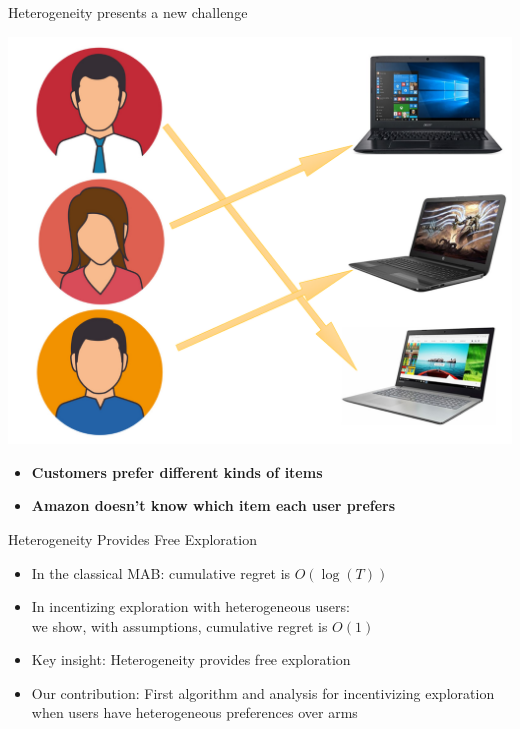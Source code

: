 \documentclass[serif]{beamer}
\begin{document}

\begin{frame}{Heterogeneity presents a new challenge}
\begin{center}
\includegraphics[scale=0.35]{example2}
\end{center}
\begin{itemize}
\item \textbf{Customers prefer different kinds of items}
\item \textbf{Amazon doesn't know which item each user prefers}
\end{itemize}

\end{frame}




\begin{frame}{Heterogeneity Provides Free Exploration}
\begin{itemize} 
\item In the classical MAB: cumulative regret is $O(\log(T))$
\item In incentizing exploration with heterogeneous users:\\ we show, with assumptions, cumulative regret is $O(1)$
\item Key insight: Heterogeneity provides free exploration
\item Our contribution: First algorithm and analysis for incentivizing exploration when users have heterogeneous preferences over arms
\end{itemize}
\end{frame}
\end{document}

